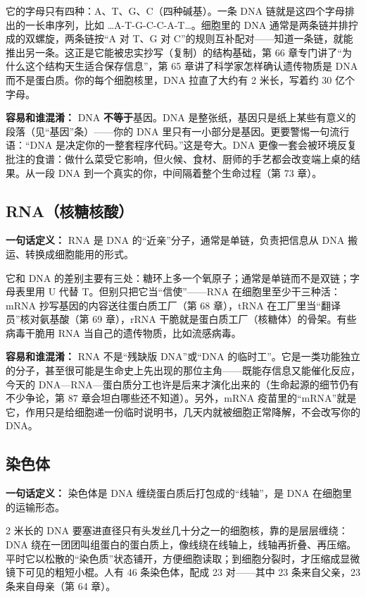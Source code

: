 它的字母只有四种：A、T、G、C（四种碱基）。一条 DNA 链就是这四个字母排出的一长串序列，比如 …A-T-G-C-C-A-T…。细胞里的 DNA 通常是两条链并排拧成的双螺旋，两条链按“A 对 T、G 对 C”的规则互补配对——知道一条链，就能推出另一条。这正是它能被忠实抄写（复制）的结构基础，第 66 章专门讲了“为什么这个结构天生适合保存信息”，第 65 章讲了科学家怎样确认遗传物质是 DNA 而不是蛋白质。你的每个细胞核里，DNA 拉直了大约有 2 米长，写着约 30 亿个字母。

\textbf{容易和谁混淆：} DNA \textbf{不等于}基因。DNA 是整张纸，基因只是纸上某些有意义的段落（见“基因”条）——你的 DNA 里只有一小部分是基因。更要警惕一句流行语：“DNA 是决定你的一整套程序代码。”这是夸大。DNA 更像一套会被环境反复批注的食谱：做什么菜受它影响，但火候、食材、厨师的手艺都会改变端上桌的结果。从一段 DNA 到一个真实的你，中间隔着整个生命过程（第 73 章）。

\subsection{RNA（核糖核酸）}

\textbf{一句话定义：} RNA 是 DNA 的“近亲”分子，通常是单链，负责把信息从 DNA 搬运、转换成细胞能用的形式。

它和 DNA 的差别主要有三处：糖环上多一个氧原子；通常是单链而不是双链；字母表里用 U 代替 T。但别只把它当“信使”——RNA 在细胞里至少干三种活：mRNA 抄写基因的内容送往蛋白质工厂（第 68 章），tRNA 在工厂里当“翻译员”核对氨基酸（第 69 章），rRNA 干脆就是蛋白质工厂（核糖体）的骨架。有些病毒干脆用 RNA 当自己的遗传物质，比如流感病毒。

\textbf{容易和谁混淆：} RNA 不是“残缺版 DNA”或“DNA 的临时工”。它是一类功能独立的分子，甚至很可能是生命史上先出现的那位主角——既能存信息又能催化反应，今天的 DNA—RNA—蛋白质分工也许是后来才演化出来的（生命起源的细节仍有不少争论，第 87 章会坦白哪些还不知道）。另外，mRNA 疫苗里的“mRNA”就是它，作用只是给细胞递一份临时说明书，几天内就被细胞正常降解，不会改写你的 DNA。

\subsection{染色体}

\textbf{一句话定义：} 染色体是 DNA 缠绕蛋白质后打包成的“线轴”，是 DNA 在细胞里的运输形态。

2 米长的 DNA 要塞进直径只有头发丝几十分之一的细胞核，靠的是层层缠绕：DNA 绕在一团团叫组蛋白的蛋白质上，像线绕在线轴上，线轴再折叠、再压缩。平时它以松散的“染色质”状态铺开，方便细胞读取；到细胞分裂时，才压缩成显微镜下可见的粗短小棍。人有 46 条染色体，配成 23 对——其中 23 条来自父亲，23 条来自母亲（第 64 章）。


